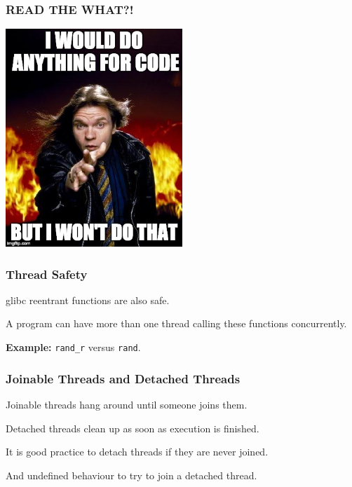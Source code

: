 \begin{frame}
\frametitle{READ THE WHAT?!}

\begin{center}
	\includegraphics[width=0.5\textwidth]{images/meatloaf.jpeg}
\end{center}

\end{frame}



\begin{frame}
  \frametitle{Thread Safety}

glibc reentrant functions are also safe.

A program can have more than one thread calling these functions concurrently.
   
{\bf Example:} {\tt rand\_r} versus {\tt rand}.

\end{frame}


\begin{frame}
\frametitle{Joinable Threads and Detached Threads}

Joinable threads hang around until someone joins them.

Detached threads clean up as soon as execution is finished.

It is good practice to detach threads if they are never joined.

And undefined behaviour to try to join a detached thread.

\end{frame}



